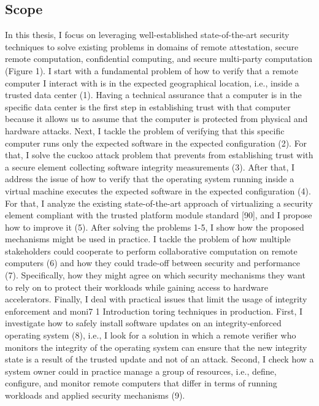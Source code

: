 \documentclass[11pt,twoside]{book}
\begin{document}
\subsection{Scope}
\raggedright In this thesis, I focus on leveraging well-established state-of-the-art security techniques to solve existing problems in domains of remote attestation, secure remote computation, confidential computing, and secure multi-party computation (Figure 1). I start with a fundamental problem of how to verify that a remote computer I interact with is in the expected geographical location, i.e., inside a trusted data center (1). Having a technical assurance that a computer is in the specific data center is the first step in establishing trust with that computer because it allows us to assume that the computer is protected from physical and hardware attacks. Next, I tackle the problem of verifying that this specific computer runs only the expected software in the expected configuration (2). For that, I solve the cuckoo attack problem that prevents from establishing trust with a secure element collecting software integrity measurements (3). After that, I address the issue of how to verify that the operating system running inside a virtual machine executes the expected software in the expected configuration (4). For that, I analyze the existing state-of-the-art approach of virtualizing a security element compliant with the trusted platform module standard [90], and I propose how to improve it (5). After solving the problems 1-5, I show how the proposed mechanisms might be used in practice. I tackle the problem of how multiple stakeholders could cooperate to perform collaborative computation on remote computers (6) and how they could trade-off between security and performance (7). Specifically, how they might agree on which security mechanisms they want to rely on to protect their workloads while gaining access to hardware accelerators. Finally, I deal with practical issues that limit the usage of integrity enforcement and moni7 1 Introduction toring techniques in production. First, I investigate how to safely install software updates on an integrity-enforced operating system (8), i.e., I look for a solution in which a remote verifier who monitors the integrity of the operating system can ensure that the new integrity state is a result of the trusted update and not of an attack. Second, I check how a system owner could in practice manage a group of resources, i.e., define, configure, and monitor remote computers that differ in terms of running workloads and applied security mechanisms (9).
\end{document}
